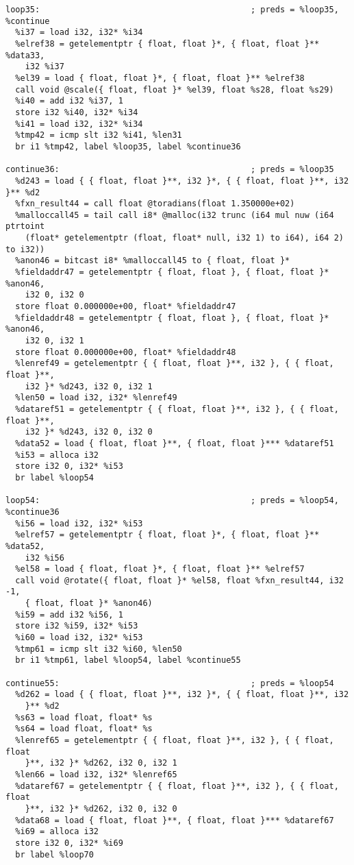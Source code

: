 \documentclass[main.tex]{subfiles}
\begin{document}
{\begin{lstlisting}
loop35:                                           ; preds = %loop35, %continue
  %i37 = load i32, i32* %i34
  %elref38 = getelementptr { float, float }*, { float, float }** %data33, 
    i32 %i37
  %el39 = load { float, float }*, { float, float }** %elref38
  call void @scale({ float, float }* %el39, float %s28, float %s29)
  %i40 = add i32 %i37, 1
  store i32 %i40, i32* %i34
  %i41 = load i32, i32* %i34
  %tmp42 = icmp slt i32 %i41, %len31
  br i1 %tmp42, label %loop35, label %continue36

continue36:                                       ; preds = %loop35
  %d243 = load { { float, float }**, i32 }*, { { float, float }**, i32 }** %d2
  %fxn_result44 = call float @toradians(float 1.350000e+02)
  %malloccall45 = tail call i8* @malloc(i32 trunc (i64 mul nuw (i64 ptrtoint
    (float* getelementptr (float, float* null, i32 1) to i64), i64 2) to i32))
  %anon46 = bitcast i8* %malloccall45 to { float, float }*
  %fieldaddr47 = getelementptr { float, float }, { float, float }* %anon46,
    i32 0, i32 0
  store float 0.000000e+00, float* %fieldaddr47
  %fieldaddr48 = getelementptr { float, float }, { float, float }* %anon46,
    i32 0, i32 1
  store float 0.000000e+00, float* %fieldaddr48
  %lenref49 = getelementptr { { float, float }**, i32 }, { { float, float }**,
    i32 }* %d243, i32 0, i32 1
  %len50 = load i32, i32* %lenref49
  %dataref51 = getelementptr { { float, float }**, i32 }, { { float, float }**,
    i32 }* %d243, i32 0, i32 0
  %data52 = load { float, float }**, { float, float }*** %dataref51
  %i53 = alloca i32
  store i32 0, i32* %i53
  br label %loop54

loop54:                                           ; preds = %loop54, %continue36
  %i56 = load i32, i32* %i53
  %elref57 = getelementptr { float, float }*, { float, float }** %data52,
    i32 %i56
  %el58 = load { float, float }*, { float, float }** %elref57
  call void @rotate({ float, float }* %el58, float %fxn_result44, i32 -1,
    { float, float }* %anon46)
  %i59 = add i32 %i56, 1
  store i32 %i59, i32* %i53
  %i60 = load i32, i32* %i53
  %tmp61 = icmp slt i32 %i60, %len50
  br i1 %tmp61, label %loop54, label %continue55

continue55:                                       ; preds = %loop54
  %d262 = load { { float, float }**, i32 }*, { { float, float }**, i32 
    }** %d2
  %s63 = load float, float* %s
  %s64 = load float, float* %s
  %lenref65 = getelementptr { { float, float }**, i32 }, { { float, float
    }**, i32 }* %d262, i32 0, i32 1
  %len66 = load i32, i32* %lenref65
  %dataref67 = getelementptr { { float, float }**, i32 }, { { float, float
    }**, i32 }* %d262, i32 0, i32 0
  %data68 = load { float, float }**, { float, float }*** %dataref67
  %i69 = alloca i32
  store i32 0, i32* %i69
  br label %loop70


\end{lstlisting}}
\end{document}
